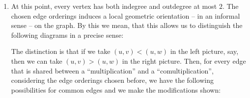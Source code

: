 \documentclass[./Thick_TQFTs_and_Quantum_Information.tex]{subfiles}
\begin{document}
\begin{enumerate}
\item At this point, every vertex has both indegree and outdegree at most $2$.
The chosen edge orderings induces a local geometric orientation -- in an
informal sense -- on the graph. By this we mean, that this allows us to
distinguish the following diagrams in a precise sense:
\begin{figure}[H]
\begin{center}
\qquad
\qquad
{}
\end{center}
\end{figure}
The distinction is that if we take $(u, v) < (u, w)$ in the left picture, say,
then we can take $(u, v) > (u, w)$ in the right picture.
Then, for every edge that is shared between a ``multiplication'' and a
``comultiplication'', considering the edge orderings chosen before, we have the
following possibilities for common edges and we make the modifications shown:
\begin{figure}[H] %
\begin{center}
\qquad
{}
\qquad
{}
\end{center}
\end{figure}


\end{enumerate}
\end{document}
